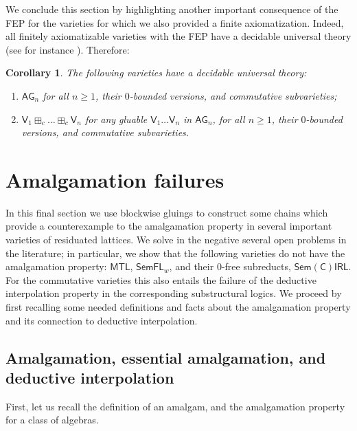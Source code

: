 \documentclass{amsart}
\newtheorem{corollary}[theorem]{Corollary}
\theoremstyle{definition}
\numberwithin{equation}{section}
\newcommand{\vv}[1]{\mathsf {#1}}
\newcommand{\BG}{\vv{AG}}
\begin{document}
We conclude this section by highlighting another important consequence of the FEP for the varieties for which we also provided a finite axiomatization. 
Indeed, all finitely axiomatizable varieties with the FEP have a decidable universal theory (see for instance \cite[\S 6.5]{GJKO}). Therefore:
\begin{corollary}
	The following varieties have a decidable universal theory:
	\begin{enumerate}
		\item $\BG_n$ for all $n \geq 1$, their $0$-bounded versions, and commutative subvarieties;
		\item $\vv V_1 \boxplus_c \ldots \boxplus_c \vv V_n$ for any gluable $\vv V_1 \ldots \vv V_n$ in $\BG_n$, for all $n \geq 1$, their $0$-bounded versions, and commutative subvarieties.
	\end{enumerate}
\end{corollary}

\section{Amalgamation failures}
In this final section we use blockwise gluings to construct some chains which provide a counterexample to the amalgamation property in several important varieties of residuated lattices. We solve in the negative several open problems in the literature; in particular, we show that the following varieties do not have the amalgamation property: $\vv{MTL}$, $\vv{SemFL}_w$, and their 0-free subreducts, $\vv{Sem(C)IRL}$. For the commutative varieties this also entails the failure of the deductive interpolation property in the corresponding substructural logics. We proceed by first recalling some needed definitions and facts about the amalgamation property and its connection to deductive interpolation.

\subsection{Amalgamation, essential amalgamation, and deductive interpolation}
First, let us recall the definition of an amalgam, and the amalgamation property for a class of algebras. 
\end{document}

